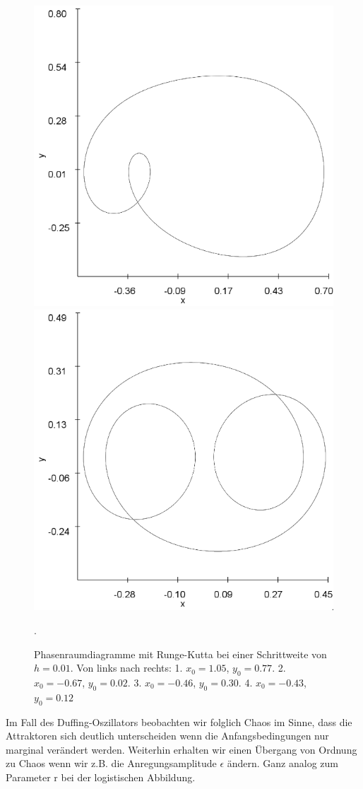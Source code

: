 \documentclass[12pt,a4paper]{article}
\begin{document}
\begin{figure}[!htbp]
\includegraphics[scale=0.20]{duffing-awp4-500k-nach-500k-h0,01-runge}
\includegraphics[scale=0.20]{duffing-awp5-500k-nach-500k-h0,01-runge}
\caption{Phasenraumdiagramme mit Runge-Kutta bei einer Schrittweite von $h=0.01$. Von links nach rechts: 1. $x_0=1.05$, $y_0=0.77$. 2. $x_0=-0.67$, $y_0=0.02$. 3. $x_0=-0.46$, $y_0=0.30$. 4. $x_0=-0.43$, $y_0=0.12$}. 
\label{fig:duffing-allawp}
\end{figure}
Im Fall des Duffing-Oszillators beobachten wir folglich Chaos im Sinne, dass die Attraktoren sich deutlich unterscheiden wenn die Anfangsbedingungen nur marginal verändert werden. Weiterhin erhalten wir einen Übergang von Ordnung zu Chaos wenn wir z.B. die Anregungsamplitude $\epsilon$ ändern. Ganz analog zum Parameter r bei der logistischen Abbildung.
\end{document}
